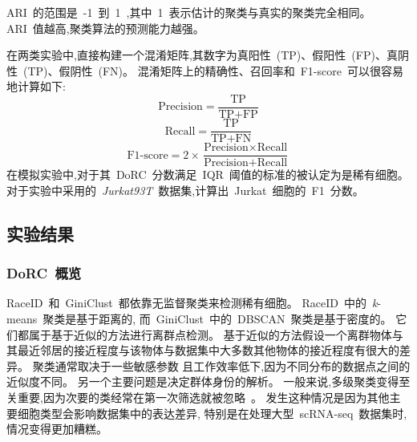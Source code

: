 ARI~的范围是~-1~到~1~,其中~1~表示估计的聚类与真实的聚类完全相同。
ARI~值越高,聚类算法的预测能力越强。

在两类实验中,直接构建一个混淆矩阵,其数字为真阳性~(TP)、假阳性~(FP)、真阴性~(TP)、假阴性~(FN)。
混淆矩阵上的精确性、召回率和~F1-score~可以很容易地计算如下:
\begin{equation}
    \label{eq:precision}
    \text{Precision} = \frac{\text{TP}}{\text{TP} + \text{FP}}
\end{equation}
\begin{equation}
    \label{eq:recall}
    \text{Recall} = \frac{\text{TP}}{\text{TP} + \text{FN}}
\end{equation}
\begin{equation}
\label{eq:f1score}
\text{F1-score} = 2 \times \frac{\text{Precision} \times \text{Recall}}{ \text{Precision} + \text{Recall}}
\end{equation}
在模拟实验中,对于其~DoRC~分数满足~IQR~阈值的标准的被认定为是稀有细胞。
对于实验中采用的~\textit{Jurkat\293T}~数据集,计算出~Jurkat~细胞的~F1~分数。


\subsection{实验结果}
\subsubsection{DoRC~概览}
\label{subsec:dorc}
RaceID~和~GiniClust~都依靠无监督聚类来检测稀有细胞。
RaceID~中的~\textit{k}-means~聚类是基于距离的,
而~GiniClust~中的~DBSCAN~聚类是基于密度的。
它们都属于基于近似的方法进行离群点检测。
基于近似的方法假设一个离群物体与其最近邻居的接近程度与该物体与数据集中大多数其他物体的接近程度有很大的差异。
聚类通常取决于一些敏感参数 且工作效率低下,因为不同分布的数据点之间的近似度不同。
另一个主要问题是决定群体身份的解析。
一般来说,多级聚类变得至关重要,因为次要的类经常在第一次筛选就被忽略~\cite{campbell2017molecular}。
发生这种情况是因为其他主要细胞类型会影响数据集中的表达差异,
特别是在处理大型~scRNA-seq~数据集时,情况变得更加糟糕。

